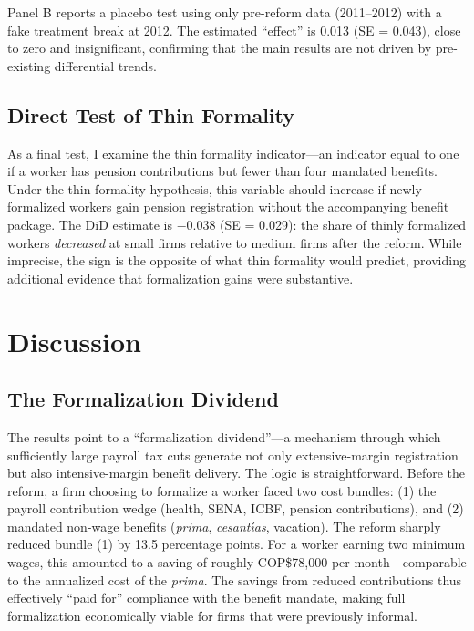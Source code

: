 \documentclass[12pt]{article}
\begin{document}
Panel B reports a placebo test using only pre-reform data (2011--2012) with a fake treatment break at 2012. The estimated ``effect'' is 0.013 (SE = 0.043), close to zero and insignificant, confirming that the main results are not driven by pre-existing differential trends.



\subsection{Direct Test of Thin Formality}

As a final test, I examine the thin formality indicator---an indicator equal to one if a worker has pension contributions but fewer than four mandated benefits. Under the thin formality hypothesis, this variable should increase if newly formalized workers gain pension registration without the accompanying benefit package. The DiD estimate is $-0.038$ (SE = 0.029): the share of thinly formalized workers \textit{decreased} at small firms relative to medium firms after the reform. While imprecise, the sign is the opposite of what thin formality would predict, providing additional evidence that formalization gains were substantive.

\section{Discussion}
\label{sec:discussion}

\subsection{The Formalization Dividend}

The results point to a ``formalization dividend''---a mechanism through which sufficiently large payroll tax cuts generate not only extensive-margin registration but also intensive-margin benefit delivery. The logic is straightforward. Before the reform, a firm choosing to formalize a worker faced two cost bundles: (1) the payroll contribution wedge (health, SENA, ICBF, pension contributions), and (2) mandated non-wage benefits (\textit{prima}, \textit{cesant\'{\i}as}, vacation). The reform sharply reduced bundle (1) by 13.5 percentage points. For a worker earning two minimum wages, this amounted to a saving of roughly COP\$78,000 per month---comparable to the annualized cost of the \textit{prima}. The savings from reduced contributions thus effectively ``paid for'' compliance with the benefit mandate, making full formalization economically viable for firms that were previously informal.
\end{document}

